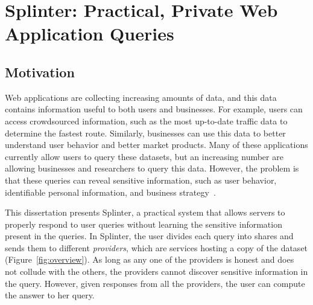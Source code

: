 \section{Splinter: Practical, Private Web Application Queries}
\label{chap:splinter}

\subsection{Motivation}

Web applications are collecting increasing amounts
of data, and this data contains information useful
to both users and businesses. For example,
users can access crowdsourced information,
such as the most up-to-date
traffic data to determine the fastest route.
Similarly, businesses can use this data to better
understand user behavior and better market products. 
Many of these applications currently allow users
to query these datasets, but an increasing number
are allowing businesses and researchers to query
this data. However, the problem is that 
these queries can reveal sensitive information,
such as user behavior, identifiable personal information, 
and business strategy~\cite{narayanan2010myths, narayanan2008robust}.


This dissertation presents Splinter, a practical system that allows servers
to properly respond to user queries without learning the sensitive information 
present in the queries.
In Splinter, the user divides each query into shares and sends them to different
\emph{providers}, which are services hosting a copy of the dataset (Figure~\ref{fig:overview}).
As long as any one of the providers is honest and does not
collude with the others, the providers cannot discover sensitive
information in the query.
However, given responses from all the providers, the user
can compute the answer to her query.

